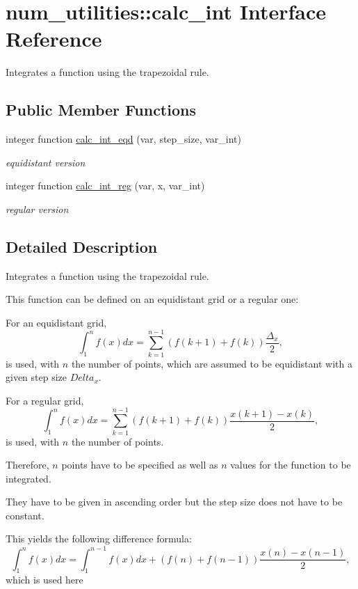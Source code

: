 \hypertarget{interfacenum__utilities_1_1calc__int}{}\section{num\+\_\+utilities\+:\+:calc\+\_\+int Interface Reference}
\label{interfacenum__utilities_1_1calc__int}


Integrates a function using the trapezoidal rule.  


\subsection*{Public Member Functions}
\begin{DoxyCompactItemize}
\item 
integer function \hyperlink{interfacenum__utilities_1_1calc__int_a7092121850ec336bfb00da92981bcfc7}{calc\+\_\+int\+\_\+eqd} (var, step\+\_\+size, var\+\_\+int)
\begin{DoxyCompactList}\small\item\em equidistant version \end{DoxyCompactList}\item 
integer function \hyperlink{interfacenum__utilities_1_1calc__int_af8120d958ad202477f2ad33369591d45}{calc\+\_\+int\+\_\+reg} (var, x, var\+\_\+int)
\begin{DoxyCompactList}\small\item\em regular version \end{DoxyCompactList}\end{DoxyCompactItemize}


\subsection{Detailed Description}
Integrates a function using the trapezoidal rule. 

This function can be defined on an equidistant grid or a regular one\+:
\begin{DoxyItemize}
\item For an equidistant grid, \[\int_1^n f(x) dx = \sum_{k=1}^{n-1} {\left(f(k+1)+f(k)\right) \frac{\Delta_x}{2}},\] is used, with $n$ the number of points, which are assumed to be equidistant with a given step size $Delta_x$.
\item For a regular grid, \[\int_1^n f(x) dx = \sum_{k=1}^{n-1} {\left(f(k+1)+f(k)\right) \frac{x(k+1)-x(k)}{2}}, \] is used, with $n$ the number of points.
\begin{DoxyItemize}
\item Therefore, $n$ points have to be specified as well as $n$ values for the function to be integrated.
\item They have to be given in ascending order but the step size does not have to be constant.
\item This yields the following difference formula\+: \[\int_1^n f(x) dx = \int_1^{n-1} f(x) dx + \left(f(n)+f(n-1)\right) \frac{x(n)-x(n-1)}{2},\] which is used here
\end{DoxyItemize}
\end{DoxyItemize}

